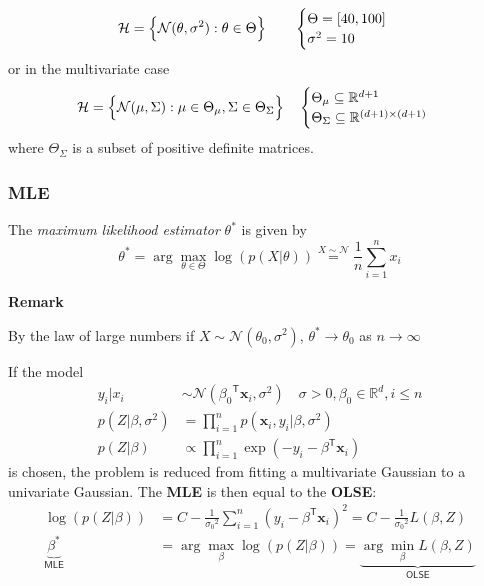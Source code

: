 \begin{examplesection}[Example]
    \noindent\begin{equation*}
        \mathcal{H}=\Bigl\{\mathcal{N}(\theta, \sigma^2): \theta\in\Theta\Bigr\}\qquad \begin{cases}
            \Theta = [40,100] \\
            \sigma^2 = 10
        \end{cases}
    \end{equation*}
    or in the multivariate case
    \noindent\begin{equation*}
        \mathcal{H}=\Bigl\{\mathcal{N}(\mu, \Sigma): \mu\in\Theta_\mu, \Sigma\in\Theta_\Sigma\Bigr\}\quad \begin{cases}
            \Theta_\mu\subseteq \mathbb{R}^{d+1} \\
            \Theta_\Sigma\subseteq \mathbb{R}^{(d+1)\times (d+1)}
        \end{cases}
    \end{equation*}
    where $\Theta_\Sigma$ is a subset of positive definite matrices.
\end{examplesection}


\subsubsection{MLE}
The \textit{maximum likelihood estimator} $\theta^*$ is given by
\noindent\begin{equation*}
    \theta^* = \arg\max_{\theta\in\Theta} \log(p(X|\theta)) \overset{X\sim\mathcal{N}}{=} \frac{1}{n} \sum_{i=1}^{n} x_i
\end{equation*}

\textbf{Remark}

By the law of large numbers if $X\sim \mathcal{N}(\theta_0, \sigma^2)$, $\theta^*\to\theta_0$ as $n\to\infty$

\begin{examplesection}
    If the model
    \noindent\begin{align*}
        y_i|x_i             & \sim \mathcal{N}({\beta_0}^{\mathsf{T}}\mathbf{x}_i, \sigma^2)\quad \sigma>0, \beta_0\in \mathbb{R}^d, i\leq n \\
        p(Z|\beta,\sigma^2) & = \prod\limits_{i=1}^n p(\mathbf{x}_i,y_i|\beta,\sigma^2)                                                      \\
        p(Z|\beta)          & \propto \prod\limits_{i=1}^n \exp\left(-y_i -\beta^{\mathsf{T}}\mathbf{x}_i\right)
    \end{align*}
    is chosen, the problem is reduced from fitting a multivariate Gaussian to a univariate Gaussian. The \textbf{MLE} is then equal to the \textbf{OLSE}:
    \noindent\begin{align*}
        \log(p(Z|\beta))                    & = C -\frac{1}{{\sigma_0}^2}\sum_{i=1}^{n} {(y_i-\beta^{\mathsf{T}}\mathbf{x}_i)}^2 = C-\frac{1}{{\sigma_0}^2}L(\beta,Z) \\
        \underbrace{\beta^*}_{\textsf{MLE}} & = \arg\max_\beta \log(p(Z|\beta)) = \underbrace{\arg\min_\beta L(\beta, Z)}_{\textsf{OLSE}}
    \end{align*}
\end{examplesection}

